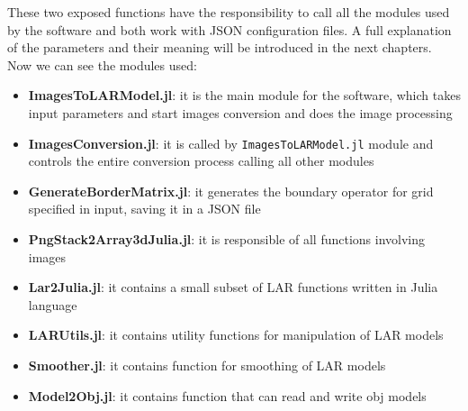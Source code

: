 These two exposed functions have the responsibility to call all the modules used by the software and both work with JSON configuration files. A full explanation of the parameters and their meaning will be introduced in the next chapters.\\

Now we can see the modules used:
\begin{itemize}
 \item \textbf{ImagesToLARModel.jl}: it is the main module for the software, which takes input parameters and start images conversion and does the image processing
 \item \textbf{ImagesConversion.jl}: it is called by \texttt{ImagesToLARModel.jl} module and controls the entire conversion process calling all other modules
 \item \textbf{GenerateBorderMatrix.jl}: it generates the boundary operator for grid specified in input, saving it in a JSON file
 \item \textbf{PngStack2Array3dJulia.jl}: it is responsible of all functions involving images
 \item \textbf{Lar2Julia.jl}: it contains a small subset of LAR functions written in Julia language
 \item \textbf{LARUtils.jl}: it contains utility functions for manipulation of LAR models
 \item \textbf{Smoother.jl}: it contains function for smoothing of LAR models
 \item \textbf{Model2Obj.jl}: it contains function that can read and write obj models
\end{itemize}
